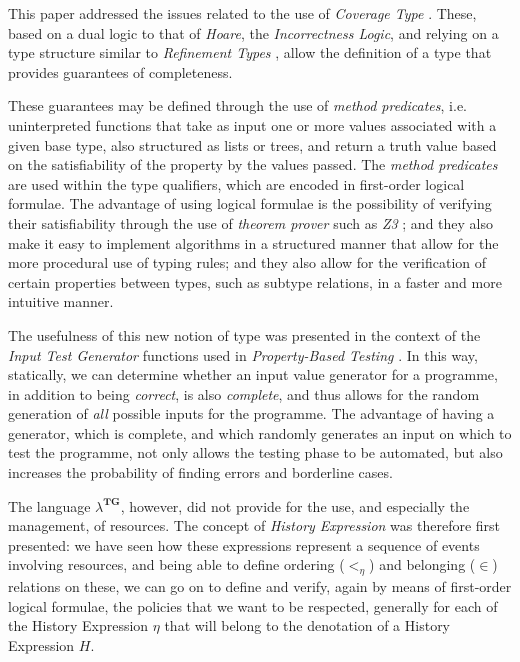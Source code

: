 This paper addressed the issues related to the use of \emph{Coverage Type} \cite{coverage}. These, based on a dual logic to that of \emph{Hoare}, the \emph{Incorrectness Logic}, and relying on a type structure similar to \emph{Refinement Types} \cite{refinement}, allow the definition of a type that provides guarantees of completeness.

These guarantees may be defined through the use of \emph{method predicates}, i.e. uninterpreted functions that take as input one or more values associated with a given base type, also structured as lists or trees, and return a truth value based on the satisfiability of the property by the values passed. The \emph{method predicates} are used within the type qualifiers, which are encoded in first-order logical formulae. The advantage of using logical formulae is the possibility of verifying their satisfiability through the use of \emph{theorem prover} such as \emph{Z3} \cite{z3}; and they also make it easy to implement algorithms in a structured manner that allow for the more procedural use of typing rules; and they also allow for the verification of certain properties between types, such as subtype relations, in a faster and more intuitive manner.

The usefulness of this new notion of type was presented in the context of the \emph{Input Test Generator} functions used in \emph{Property-Based Testing} \cite{PBT1, PBT2}. In this way, statically, we can determine whether an input value generator for a programme, in addition to being \emph{correct}, is also \emph{complete}, and thus allows for the random generation of \emph{all} possible inputs for the programme.
The advantage of having a generator, which is complete, and which randomly generates an input on which to test the programme, not only allows the testing phase to be automated, but also increases the probability of finding errors and borderline cases.

The language $\lambda^{\textbf{TG}}$, however, did not provide for the use, and especially the management, of resources. The concept of \emph{History Expression} \cite{history2, history3, history} was therefore first presented: we have seen how these expressions represent a sequence of events involving resources, and being able to define ordering ($<_{\eta}$) and belonging ($\in$) relations on these, we can go on to define and verify, again by means of first-order logical formulae, the policies that we want to be respected, generally for each of the History Expression $\eta$ that will belong to the denotation of a History Expression $H$.

